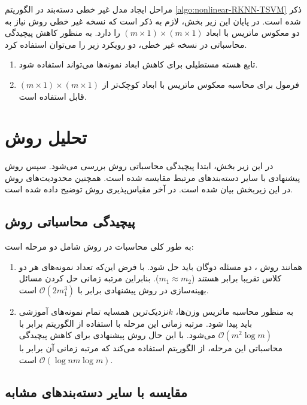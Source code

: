 مراحل ایجاد مدل غیر خطی دسته‌بند  در الگوریتم \ref{algo:nonlinear-RKNN-TSVM} ذکر شده است. در پایان این زیر بخش، لازم به ذکر است که نسخه غیر خطی روش  نیاز به دو معکوس ماتریس با ابعاد  $(m \times 1) \times (m \times 1)$ را دارد. به منظور کاهش پیچیدگی محاسباتی در نسخه غیر خطی، دو رویکرد زیر را می‌توان استفاده کرد.
\begin{enumerate}
	\item تابع هسته مستطیلی \cite{mang2001} برای کاهش ابعاد نمونه‌ها می‌تواند استفاده شود.
	\item فرمول  برای محاسبه معکوس ماتریس با ابعاد کوچک‌تر از $(m \times 1) \times (m \times 1)$  قابل استفاده است.
\end{enumerate}

\section{تحلیل روش }\label{sec:4:6}
در این زیر بخش، ابتدا پیچیدگی محاسباتی روش  بررسی می‌شود. سپس روش پیشنهادی با سایر دسته‌بندهای مرتبط مقایسه شده است. همچنین محدودیت‌های روش  در این زیربخش بیان شده است. در آخر مقیاس‌پذیری روش  توضیح داده شده است.

\newpage
\subsection{پیچیدگی محاسباتی روش }\label{sec:4:6:1}
به طور کلی محاسبات در روش  شامل دو مرحله است:
\begin{enumerate}
	\item همانند روش ، دو مسئله دوگان باید حل شود. با فرض این‌که تعداد نمونه‌های هر دو کلاس تقریبا برابر هستند ($m_{1} \approx m_{2}$). بنابراین مرتبه زمانی حل کردن مسائل بهینه‌سازی در روش پیشنهادی برابر با $\mathcal{O}(2m^{3}_{1})$  است.
	\item به منظور محاسبه ماتریس وزن‌ها،   $k$نزدیک‌ترین همسایه تمام نمونه‌های آموزشی باید پیدا شود. مرتبه زمانی این مرحله با استفاده از الگوریتم  برابر با  $\mathcal{O}(m^{2}\log{m})$ می‌شود. با این حال روش پیشنهادی برای کاهش پیچیدگی محاسباتی این مرحله، از الگوریتم  استفاده می‌کند که مرتبه زمانی آن برابر با  $\mathcal{O}(\log{n}m\log{m})$ است.
\end{enumerate}

\subsection{مقایسه با سایر دسته‌بندهای مشابه}\label{sec:4:6:2}
